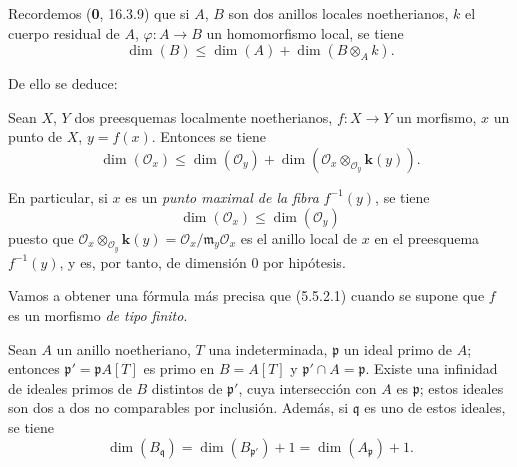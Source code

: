 \begin{env}[5.5.1]
\label{IV.2.s5.5.1-fr}
Recordemos (\textbf 0, 16.3.9) que si $A$, $B$ son dos anillos locales noetherianos,
$k$ el cuerpo residual de $A$, $\varphi:A\to B$ un homomorfismo local, se tiene
\begin{equation}
\dim(B)\leq\dim(A)+\dim(B\otimes_A k).
\tag{5.5.1.1}\label{IV.2.s5.5.1.1-fr}
\end{equation}
\end{env}

De ello se deduce:

\begin{proposition}[5.5.2]
\label{IV.2.s5.5.2-fr}
Sean $X$, $Y$ dos preesquemas localmente noetherianos, $f:X\to Y$ un
morfismo, $x$ un punto de $X$, $y=f(x)$. Entonces se tiene
\begin{equation}
\dim(\mathcal O_x)\leq\dim(\mathcal O_y)
+\dim(\mathcal O_x\otimes_{\mathcal O_y}\boldsymbol{k}(y)).
\tag{5.5.2.1}\label{IV.2.s5.5.2.1-fr}
\end{equation}
\end{proposition}


En particular, si $x$ es un \emph{punto maximal de la fibra} $f^{-1}(y)$, se tiene
\begin{equation}
\dim(\mathcal O_x)\leq\dim(\mathcal O_y)
\tag{5.5.2.2}\label{IV.2.s5.5.2.2-fr}
\end{equation}
puesto que $\mathcal O_x\otimes_{\mathcal O_y}\boldsymbol{k}(y)
=\mathcal O_x/\mathfrak m_y\mathcal O_x$ es el anillo local de $x$ en el
preesquema $f^{-1}(y)$, y es, por tanto, de dimensión $0$ por hipótesis.

Vamos a obtener una fórmula más precisa que (5.5.2.1) cuando se supone que
$f$ es un morfismo \emph{de tipo finito}.

\begin{proposition}[5.5.3]
\label{IV.2.s5.5.3-fr}
Sean $A$ un anillo noetheriano, $T$ una indeterminada, $\mathfrak p$ un ideal
primo de $A$; entonces $\mathfrak p'=\mathfrak pA[T]$ es primo en
$B=A[T]$ y $\mathfrak p'\cap A=\mathfrak p$. Existe una infinidad de
ideales primos de $B$ distintos de $\mathfrak p'$, cuya intersección
con $A$ es $\mathfrak p$; estos ideales son dos a dos no comparables por
inclusión. Además, si $\mathfrak q$ es uno de estos ideales, se tiene
\begin{equation}
\dim(B_{\mathfrak q})=\dim(B_{\mathfrak p'})+1
=\dim(A_{\mathfrak p})+1.
\tag{5.5.3.1}\label{IV.2.s5.5.3.1-fr}
\end{equation}
\end{proposition}

